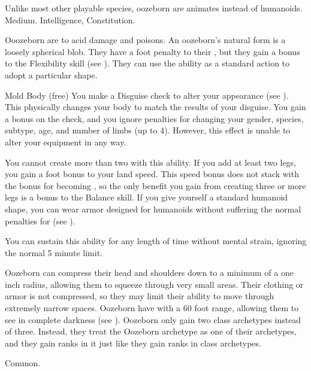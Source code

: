          Unlike most other playable species, oozeborn are animates instead of humanoids.
         Medium.
          Intelligence,  Constitution.
        \begin{itemize}
             Ooozeborn are  to acid damage and poisons.
             An oozeborn's natural form is a loosely spherical blob.
                They have a  foot penalty to their , but they gain a  bonus to the Flexibility skill (see ).
                They can use the  ability as a standard action to adopt a particular shape.
                \begin{sustainability}{Mold Body}{ (free)}
                    \rankline
                    You make a Disguise check to alter your appearance (see ).
                    This physically changes your body to match the results of your disguise.
                    You gain a  bonus on the check, and you ignore penalties for changing your gender, species, subtype, age, and number of limbs (up to 4).
                    However, this effect is unable to alter your equipment in any way.

                    You cannot create more than two  with this ability.
                    If you add at least two legs, you gain a  foot bonus to your land speed.
                    This speed bonus does not stack with the bonus for becoming , so the only benefit you gain from creating three or more legs is a  bonus to the Balance skill.
                    If you give yourself a standard humanoid shape, you can wear armor designed for humanoids without suffering the normal penalties for  (see ).

                    You can sustain this ability for any length of time without mental strain, ignoring the normal 5 minute limit.
                \end{sustainability}
             Oozeborn can compress their head and shoulders down to a minimum of a one inch radius, allowing them to squeeze through very small areas.
                Their clothing or armor is not compressed, so they may limit their ability to move through extremely narrow spaces.
             Oozeborn have  with a 60 foot range, allowing them to see in complete darkness (see ).
             Oozeborn only gain two class archetypes instead of three.
                Instead, they treat the Oozeborn archetype as one of their archetypes, and they gain ranks in it just like they gain ranks in class archetypes.
        \end{itemize}
         Common.
        
